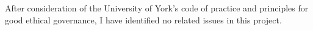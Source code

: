 After consideration of the University of York's code of practice and principles for good ethical governance, I have identified no related issues in this project.